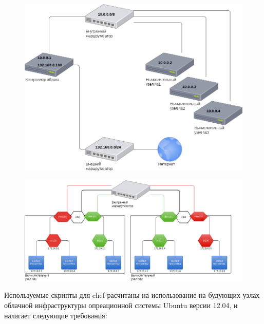 \documentclass[letterpaper,10pt,russian]{sphinxmanual}
\begin{document}


\begin{figure}[htbp]
\centering

\includegraphics{first.png}
\end{figure}
\begin{figure}[htbp]
\centering

\includegraphics{second.png}
\end{figure}

Используемые скрипты для chef расчитаны на использование на будующих узлах облачной инфраструктуры опреационной системы Ubuntu версии 12.04, и налагает следующие требования:
\end{document}
